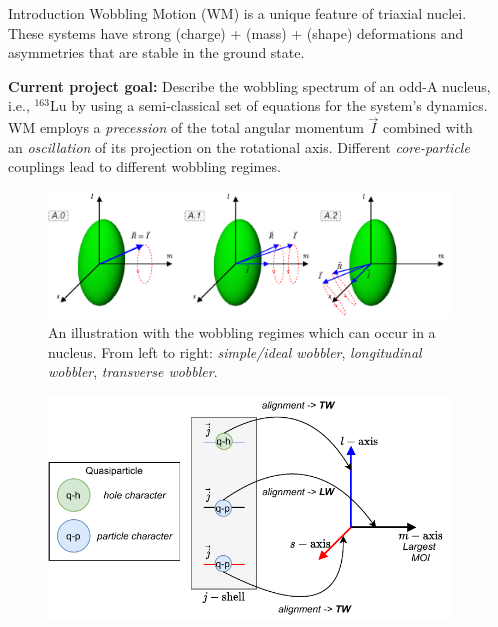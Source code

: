 \documentclass[final]{beamer}
\newlength{\sepwidth}
\newlength{\colwidth}
\newcommand{\separatorcolumn}{\begin{column}{\sepwidth}\end{column}}
\begin{document}
\begin{frame}[t]
\begin{columns}[t]
\separatorcolumn
\begin{column}{\colwidth}
  \begin{block}{Introduction}
Wobbling Motion (WM) is a unique feature of triaxial nuclei. These systems have strong (charge) + (mass) + (shape) deformations and asymmetries that are stable in the ground state.

\textbf{Current project goal:} Describe the wobbling spectrum of an odd-A nucleus, i.e., $^{163}$Lu by using a semi-classical set of equations for the system's dynamics.
  WM employs a \emph{precession} of the total angular momentum $\vec{I}$ combined with an \emph{oscillation} of its projection on the rotational axis. Different \emph{core-particle} couplings lead to different wobbling regimes.
  \begin{figure}
      \centering
     \includegraphics[scale=1.5]{images/wobbling_Regimes_COUPLING_SCHEME.pdf}
      \caption{An illustration with the wobbling regimes which can occur in a nucleus. From left to right: \emph{simple/ideal wobbler}, \emph{longitudinal wobbler}, \emph{transverse wobbler}.}
      \label{wobbling-regimes}
  \end{figure}
  \begin{figure}
      \centering
     \includegraphics[scale=2.3]{images/wobbling_Regimes_updated.pdf}

\end{figure}
\end{block}
\end{column}
\end{columns}
\end{frame}
\end{document}
